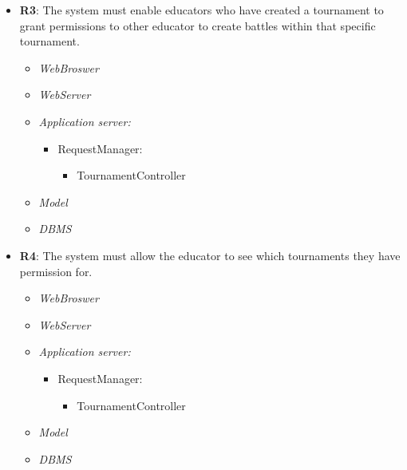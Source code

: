 \begin{itemize}
        \item \textbf{R3}: The system must enable educators who have created a tournament to grant permissions to other
educator to create battles within that specific tournament.
            \begin{itemize}
                \item \textit{WebBroswer}
                \item \textit{WebServer}
                \item \textit{Application server:}\begin{itemize}
                    \item RequestManager:\begin{itemize}
                        \item TournamentController
                    \end{itemize}
                \end{itemize}
                \item \textit{Model}
                \item \textit{DBMS}
            \end{itemize}
        
        \item \textbf{R4}: The system must allow the educator to see which tournaments they have permission for.
             \begin{itemize}
                \item \textit{WebBroswer}
                \item \textit{WebServer}
                \item \textit{Application server:}\begin{itemize}
                    \item RequestManager:\begin{itemize}
                        \item TournamentController
                    \end{itemize}
                \end{itemize}
                \item \textit{Model}
                \item \textit{DBMS}
            \end{itemize}


\end{itemize}

